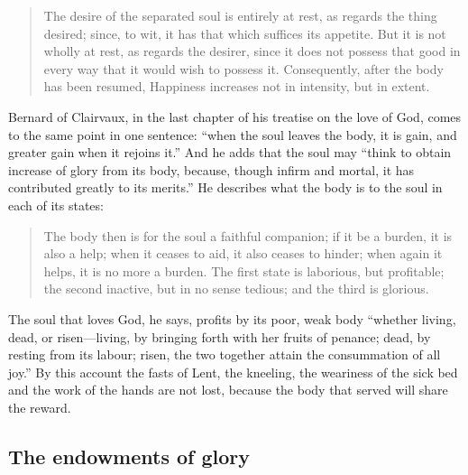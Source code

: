 \begin{quote}
The desire of the separated soul is entirely at rest, as regards the thing desired; since, to wit, it has that which suffices its appetite. But it is not wholly at rest, as regards the desirer, since it does not possess that good in every way that it would wish to possess it. Consequently, after the body has been resumed, Happiness increases not in intensity, but in extent.
\end{quote}

Bernard of Clairvaux, in the last chapter of his treatise on the love of God, comes to the same point in one sentence: ``when the soul leaves the body, it is gain, and greater gain when it rejoins it.'' And he adds that the soul may ``think to obtain increase of glory from its body, because, though infirm and mortal, it has contributed greatly to its merits.'' He describes what the body is to the soul in each of its states:

\begin{quote}
The body then is for the soul a faithful companion; if it be a burden, it is also a help; when it ceases to aid, it also ceases to hinder; when again it helps, it is no more a burden. The first state is laborious, but profitable; the second inactive, but in no sense tedious; and the third is glorious.
\end{quote}

The soul that loves God, he says, profits by its poor, weak body ``whether living, dead, or risen---living, by bringing forth with her fruits of penance; dead, by resting from its labour; risen, the two together attain the consummation of all joy.'' By this account the fasts of Lent, the kneeling, the weariness of the sick bed and the work of the hands are not lost, because the body that served will share the reward.

\subsection{The endowments of glory}

